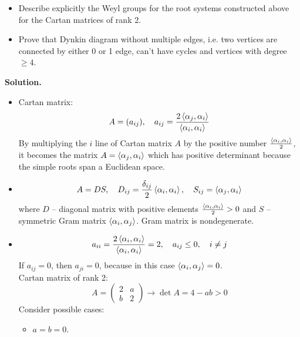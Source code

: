 \documentclass[12pt]{article}
\theoremstyle{definition}
\begin{document}
\begin{enumerate}
\begin{itemize}
        \item Describe explicitly the Weyl groups for the root systems constructed above for the Cartan matrices of rank 2.
        \item Prove that Dynkin diagram without multiple edges, i.e. two vertices are connected by either 0 or 1 edge, can't have cycles and vertices with degree $\geq 4$.
    \end{itemize}
    \textbf{Solution.}
    \begin{itemize}
        \item Cartan matrix:
        \begin{equation}
            A=(a_{ij}),\quad a_{ij}=\frac{2\braket{\alpha_j,\alpha_i}}{\braket{\alpha_i,\alpha_i}}
        \end{equation}
        By multiplying the $i$ line of Cartan matrix $A$ by the positive number $\frac{\braket{\alpha_i,\alpha_i}}{2}$, it becomes the matrix $A=\braket{\alpha_j,\alpha_i}$ which has positive determinant because the simple roots span a Euclidean space.
        \item 
        \begin{equation}
            A=DS,\quad D_{ij}=\frac{\delta_{ij}}{2}\braket{\alpha_i,\alpha_i},\quad S_{ij}=\braket{\alpha_j,\alpha_i}
        \end{equation}
        where $D$ -- diagonal matrix with positive elements $\frac{\braket{\alpha_i,\alpha_i}}{2}>0$ and $S$ -- symmetric Gram matrix $\braket{\alpha_i,\alpha_j}$. Gram matrix is nondegenerate.
        \item
        \begin{equation}
            a_{ii}=\frac{2\braket{\alpha_i,\alpha_i}}{\braket{\alpha_i,\alpha_i}}=2,\quad a_{ij}\leq0,\quad i\neq j
        \end{equation}
        If $a_{ij}=0$, then $a_{ji}=0$, because in this case $\braket{\alpha_i,\alpha_j}=0$.\\
        Cartan matrix of rank 2:
        \begin{equation}
            A=\begin{pmatrix}
                2 & a\\
                b & 2
            \end{pmatrix}\rightarrow \det A=4-ab>0
        \end{equation}
        Consider possible cases:
        \begin{itemize}
            \item $a=b=0$.\\

\end{itemize}
\end{itemize}
\end{enumerate}
\end{document}
